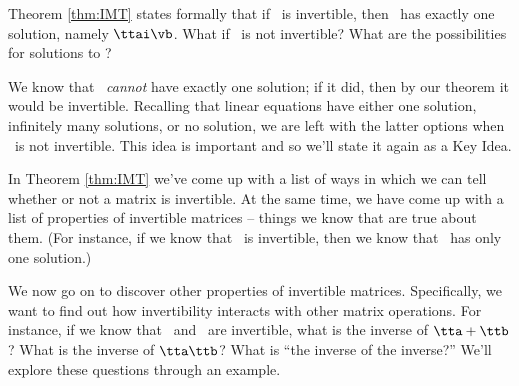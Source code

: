 Theorem \ref{thm:IMT} states formally that if \tta\ is invertible, then \ttaxb\ has exactly one solution, namely $\ttai\vb$. What if \tta\ is not invertible? What are the possibilities for solutions to \ttaxb? 

We know that \ttaxb\ \textit{cannot} have exactly one solution; if it did, then by our theorem it would be invertible. Recalling that linear equations have either one solution, infinitely many solutions, or no solution, we are left with the latter options when \tta\ is not invertible. This idea is important and so we'll state it again as a Key Idea.

\smallskip


\smallskip

In Theorem \ref{thm:IMT} we've come up with a list of ways in which we can tell whether or not a matrix is invertible. At the same time, we have come up with a list of properties of invertible matrices -- things we know that are true about them. (For instance, if we know that \tta\ is invertible, then we know that \ttaxb\ has only one solution.) 

We now go on to discover other properties of invertible matrices. Specifically, we want to find out how invertibility interacts with other matrix operations. For instance, if we know that \tta\ and \ttb\ are invertible, what is the inverse of $\tta+\ttb$? What is the inverse of $\tta\ttb$? What is ``the inverse of the inverse?'' We'll explore these questions through an example.\\


